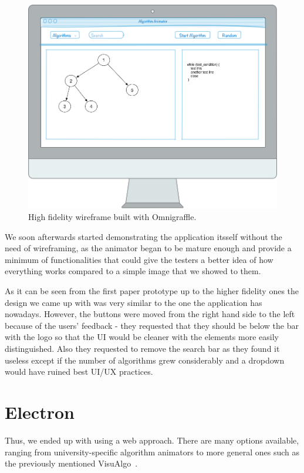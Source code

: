 \documentclass{l4proj}
\begin{document}
\begin{figure}[!ht]
    \centering
    \includegraphics[scale=0.3]{high_fidelity_prototype}
    \caption{High fidelity wireframe built with Omnigraffle.}
    \label{fig:high_fidelity_prototype}
\end{figure}

We soon afterwards started demonstrating the application itsself without the need of wireframing, as the animator began to be
mature enough and provide a minimum of functionalities that could give the testers a better idea of how everything
works compared to a simple image that we showed to them.

As it can be seen from the first paper prototype up to the higher fidelity ones the design we came up with was very
similar to the one the application has nowadays. However, the buttons were moved from the right hand side to the left because
of the users' feedback - they requested that they should be below the bar with the logo so that the UI would be cleaner with the elements more easily distinguished. Also they requested to remove the search bar as they found
it useless except if the number of algorithms grew considerably and a dropdown would have ruined best UI/UX practices.

\section{Electron}

Thus, we ended up with using a web approach. There are many options available, ranging from university-specific algorithm animators to more general ones such as the previously mentioned VisuAlgo~\cite{visualgo}.
\end{document}
